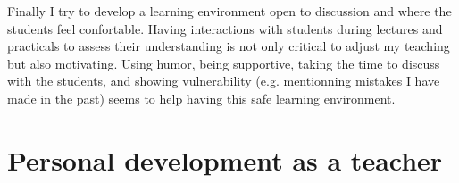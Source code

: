 \documentclass[12pt]{article}
\begin{document}
\bigskip

Finally I try to develop a learning environment open to discussion and
where the students feel confortable. Having interactions with students
during lectures and practicals to assess their understanding is not
only critical to adjust my teaching but also motivating. Using humor,
being supportive, taking the time to discuss with the students, and
showing vulnerability (e.g. mentionning mistakes I have made in the
past) seems to help having this safe learning environment.




\section{Personal development as a teacher}
\label{sec:orgb0f6deb}
\end{document}
